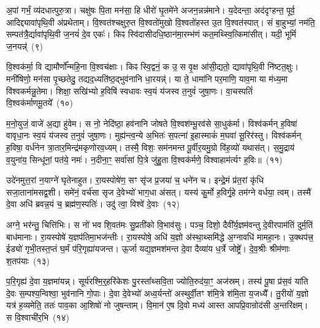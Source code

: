 अ॒पां गर्भं॒ व्य॑दधात्पुरु॒त्रा। चक्षु॑षः पि॒ता मन॑सा॒ हि धीरो॑ घृ॒तमे॑ने अजन॒न्नन्न॑माने। य॒देदन्ता॒ अद॑दृꣳहन्त॒ पूर्व॒ आदिद्द्यावा॑पृथि॒वी अ॑प्रथेताम्। वि॒श्वत॑श्चक्षुरु॒त वि॒श्वतो॑मुखो वि॒श्वतो॑हस्त उ॒त वि॒श्वत॑स्पात्। सं बा॒हुभ्यां॒ नम॑ति॒ सम्पत॑त्रै॒र्द्यावा॑पृथि॒वी ज॒नयं॑ दे॒व एकः॑। किꣴ स्वि॑दासीदधि॒ष्ठान॑मा॒रम्भ॑णं कत॒मथ्स्वि॒त्किमा॑सीत्। यदी॒ भूमिं॑ ज॒नयन्न्॑~(९)

वि॒श्वक॑र्मा॒ वि द्यामौर्णो᳚न्महि॒ना वि॒श्वच॑क्षाः। किꣴ स्वि॒द्वनं॒ क उ॒ स वृ॒क्ष आ॑सी॒द्यतो॒ द्यावा॑पृथि॒वी नि॑ष्टत॒क्षुः। मनी॑षिणो॒ मन॑सा पृ॒च्छतेदु॒ तद्यद॒ध्यति॑ष्ठ॒द्भुव॑नानि धा॒रयन्न्॑। या ते॒ धामा॑नि पर॒माणि॒ याव॒मा या म॑ध्य॒मा वि॑श्वकर्मन्नु॒तेमा। शिक्षा॒ सखि॑भ्यो ह॒विषि॑ स्वधावः स्व॒यं य॑जस्व त॒नुवं॑ जुषा॒णः। वा॒चस्पतिं॑ वि॒श्वक॑र्माणमू॒तये᳚~(१०)

म॒नो॒युजं॒ वाजे॑ अ॒द्या हु॑वेम। स नो॒ नेदि॑ष्ठा॒ हव॑नानि जोषते वि॒श्वश॑म्भू॒रव॑से सा॒धुक॑र्मा। विश्व॑कर्मन् ह॒विषा॑ वावृधा॒नः स्व॒यं य॑जस्व त॒नुवं॑ जुषा॒णः। मुह्य॑न्त्व॒न्ये अ॒भितः॑ स॒पत्ना॑ इ॒हास्माकं॑ म॒घवा॑ सू॒रिर॑स्तु। विश्व॑कर्मन् ह॒विषा॒ वर्ध॑नेन त्रा॒तार॒मिन्द्र॑मकृणोरव॒ध्यम्। तस्मै॒ विशः॒ सम॑नमन्त पू॒र्वीर॒यमु॒ग्रो वि॑ह॒व्यो॑ यथास॑त्। स॒मु॒द्राय॑ व॒युना॑य॒ सिन्धू॑नां॒ पत॑ये॒ नमः॑। न॒दीना॒ꣳ॒ सर्वा॑सां पि॒त्रे जु॑हु॒ता वि॒श्वक॑र्मणे॒ विश्वाहाम॑र्त्यꣳ ह॒विः॥~(११)

{\anuvakamend[{ज॒जानै॒नौष॑धीनां॒ भूमिं॑ ज॒नय॑न्नू॒तये॒ नमो॒ नव॑ च}]}%

उदे॑नमुत्त॒रां न॒याग्ने॑ घृतेनाहुत। रा॒यस्पोषे॑ण॒ सꣳ सृ॑ज प्र॒जया॑ च॒ धने॑न च। इन्द्रे॒मं प्र॑त॒रां कृ॑धि सजा॒ताना॑मसद्व॒शी। समे॑नं॒ वर्च॑सा सृज दे॒वेभ्यो॑ भाग॒धा अ॑सत्। यस्य॑ कु॒र्मो ह॒विर्गृ॒हे तम॑ग्ने वर्धया॒ त्वम्। तस्मै॑ दे॒वा अधि॑ ब्रवन्न॒यं च॒ ब्रह्म॑ण॒स्पतिः॑। उदु॑ त्वा॒ विश्वे॑ दे॒वाः~(१२)

अग्ने॒ भर॑न्तु॒ चित्ति॑भिः। स नो॑ भव शि॒वत॑मः सु॒प्रती॑को वि॒भाव॑सुः। पञ्च॒ दिशो॒ दैवी᳚र्य॒ज्ञम॑वन्तु दे॒वीरपाम॑तिं दुर्म॒तिं बाध॑मानाः। रा॒यस्पोषे॑ य॒ज्ञप॑तिमा॒भज॑न्तीः। रा॒यस्पोषे॒ अधि॑ य॒ज्ञो अ॑स्था॒थ्समि॑द्धे अ॒ग्नावधि॑ मामहा॒नः। उ॒क्थप॑त्त्र॒ ईड्यो॑ गृभी॒तस्त॒प्तं घ॒र्मं प॑रि॒गृह्या॑यजन्त। ऊ॒र्जा यद्य॒ज्ञमश॑मन्त दे॒वा दैव्या॑य ध॒र्त्रे जोष्ट्रे᳚। दे॒व॒श्रीः श्रीम॑णाः श॒तप॑याः~(१३)

प॒रि॒गृह्य॑ दे॒वा य॒ज्ञमा॑यन्न्। सूर्य॑रश्मि॒र्॒\mbox{}हरि॑केशः पु॒रस्ता᳚थ्सवि॒ता ज्योति॒रुद॑या॒ꣳ॒ अज॑स्रम्। तस्य॑ पू॒षा प्र॑स॒वं या॑ति दे॒वः स॒म्पश्य॒न्विश्वा॒ भुव॑नानि गो॒पाः। दे॒वा दे॒वेभ्यो॑ अध्व॒र्यन्तो॑ अस्थुर्वी॒तꣳ श॑मि॒त्रे श॑मि॒ता य॒जध्यै᳚। तु॒रीयो॑ य॒ज्ञो यत्र॑ ह॒व्यमेति॒ ततः॑ पाव॒का आ॒शिषो॑ नो जुषन्ताम्। वि॒मान॑ ए॒ष दि॒वो मध्य॑ आस्त आपप्रि॒वान्रोद॑सी अ॒न्तरि॑क्षम्। स वि॒श्वाची॑र॒भि~(१४)


